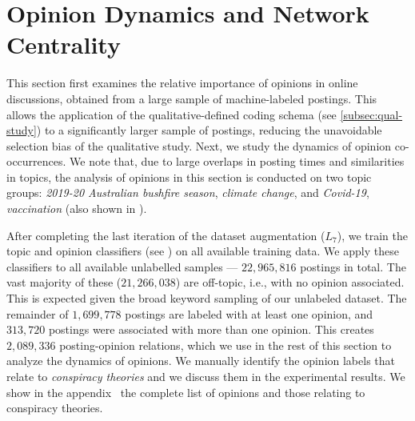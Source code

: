 
\section{Opinion Dynamics and Network Centrality}
\label{sec:opinion-analysis}

This section first examines the relative importance of opinions in online discussions, obtained from a large sample of machine-labeled postings.
This allows the application of the qualitative-defined coding schema (see \cref{subsec:qual-study}) to a significantly larger sample of postings, reducing the unavoidable selection bias of the qualitative study. 
Next, we study the dynamics of opinion co-occurrences. We note that, due to large overlaps in posting times and similarities in topics, the analysis of opinions in this section is conducted on two topic groups: \textit{2019-20 Australian bushfire season}, \textit{climate change}, and \textit{Covid-19}, \textit{vaccination} (also shown in ).


After completing the last iteration of the dataset augmentation ($L_7$), we train the topic and opinion classifiers (see ) on all available training data.
We apply these classifiers to all available unlabelled samples ---
$22,965,816$ postings in total.
The vast majority of these ($21,266,038$) are off-topic, i.e., with no opinion associated. 
This is expected given the broad keyword sampling of our unlabeled dataset.
The remainder of $1,699,778$ postings are labeled with at least one opinion, and $313,720$ postings were associated with more than one opinion.
This creates $2,089,336$ posting-opinion relations, which we use in the rest of this section to analyze the dynamics of opinions. 
We manually identify the opinion labels that relate to \textit{conspiracy theories}
and we discuss them in the experimental results.
We show in the appendix~\citep{appendix} the complete list of opinions and those relating to conspiracy theories.

